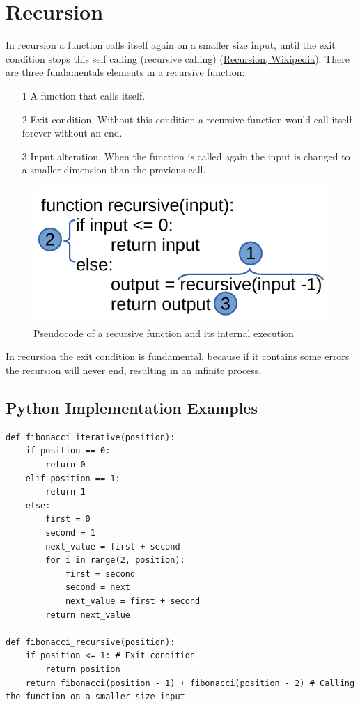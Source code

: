 \section{Recursion}
In recursion a function calls itself again on a smaller size input, until the exit condition stops this self calling (recursive calling) \cite{wikirecursion} (\href{https://en.wikipedia.org/wiki/Recursion_(computer_science)}{Recursion, Wikipedia}). There are three fundamentals elements in a recursive function:
\begin{itemize}
\item[1] A function that calls itself.
\item[2] Exit condition. Without this condition a recursive function would call itself forever without an end.
\item[3] Input alteration. When the function is called again the input is changed to a smaller dimension than the previous call.
\end{itemize}

\begin{figure}[hb]
	\begin{center}
		\includegraphics[scale=.6]{chapters/introduction/images/recursion_1.pdf}
		\caption[Pseudocode of a recursive function and its internal execution]{Pseudocode of a recursive function and its internal execution}
		\label{fig:recursion_1}
	\end{center}
\end{figure}

In recursion the exit condition is fundamental, because if it contains some errors the recursion will never end, resulting in an infinite process.

\subsection{Python Implementation Examples}

\begin{lstlisting}[firstnumber=1, caption={Implementation of the Fibonacci series with both iterative and recursive way.}]
def fibonacci_iterative(position):
	if position == 0:
		return 0
	elif position == 1:
		return 1
	else:
		first = 0
		second = 1
		next_value = first + second
		for i in range(2, position):
			first = second
			second = next
			next_value = first + second
		return next_value

def fibonacci_recursive(position):
	if position <= 1: # Exit condition
		return position
	return fibonacci(position - 1) + fibonacci(position - 2) # Calling the function on a smaller size input
\end{lstlisting}

